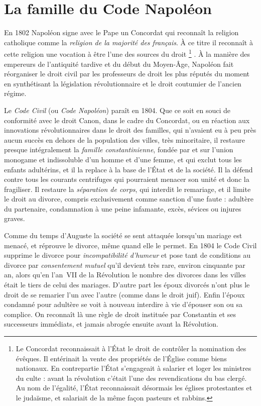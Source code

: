 


\chapter{La famille du Code Napoléon}


 En 1802 Napoléon signe avec le Pape un Concordat qui reconnaît la religion catholique comme la \emph{religion de la majorité des français}. À ce titre il reconnaît à cette religion une vocation à être l'une des sources du droit%
\footnote{Le Concordat reconnaissait à l'État le droit de contrôler la nomination des évêques. Il entérinait la vente des propriétés de l'Église comme biens nationaux. En contrepartie l'État s'engageait à salarier et loger les ministres du culte : avant la révolution c'était l'une des revendications du bas clergé. Au nom de l'égalité, l'État reconnaissait désormais les églises protestantes et le judaïsme, et salariait de la même façon pasteurs et rabbins.}%
. À la manière des empereurs de l'antiquité tardive et du début du Moyen-Âge, Napoléon fait réorganiser le droit civil par les professeurs de droit les plus réputés du moment en synthétisant la législation révolutionnaire et le droit coutumier de l'ancien régime. 

 Le \emph{Code Civil} (ou \emph{Code Napoléon}) paraît en 1804. Que ce soit en souci de conformité avec le droit Canon, dans le cadre du Concordat, ou en réaction aux innovations révolutionnaires dans le droit des familles, qui n'avaient eu à peu près aucun succès en dehors de la population des villes, très minoritaire, il restaure presque intégralement la \emph{famille constantinienne}, fondée par et sur l'union monogame et indissoluble d'un homme et d'une femme, et qui exclut tous les enfants adultérins, et il la replace à la base de l'État et de la société. Il la défend contre tous les courants centrifuges qui pourraient menacer son unité et donc la fragiliser. Il restaure la \emph{séparation de corps}, qui interdit le remariage, et il limite le droit au divorce, compris exclusivement comme sanction d'une faute : adultère du partenaire, condamnation à une peine infamante, excès, sévices ou injures graves. 

 Comme du temps d'Auguste la société se sent attaquée lorsqu'un mariage est menacé, et réprouve le divorce, même quand elle le permet. En 1804 le Code Civil supprime le divorce pour \emph{incompatibilité d'humeur} et pose tant de conditions au divorce par \emph{consentement mutuel} qu'il devient très rare, environ cinquante par an, alors qu'en l'an~VII de la Révolution le nombre des divorces dans les villes était le tiers de celui des mariages. D'autre part les époux divorcés n'ont plus le droit de se remarier l'un avec l'autre (comme dans le droit juif). Enfin l'époux condamné pour adultère se voit à nouveau interdire à vie d'épouser son ou sa complice. On reconnaît là une règle de droit instituée par Constantin et ses successeurs immédiats, et jamais abrogée ensuite avant la Révolution.

